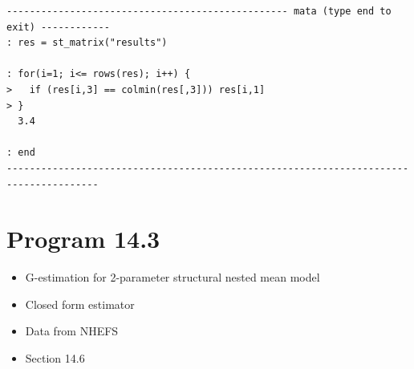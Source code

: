 \documentclass[
  10pt,
  a4paper,
]{book}
\providecommand{\tightlist}{%
  \setlength{\itemsep}{0pt}\setlength{\parskip}{0pt}}
\begin{document}
\begin{verbatim}
------------------------------------------------- mata (type end to exit) ------------
: res = st_matrix("results")

: for(i=1; i<= rows(res); i++) { 
>   if (res[i,3] == colmin(res[,3])) res[i,1]
> }
  3.4

: end
--------------------------------------------------------------------------------------
\end{verbatim}

\section{Program 14.3}\label{program-14.3-1}

\begin{itemize}
\tightlist
\item
  G-estimation for 2-parameter structural nested mean model
\item
  Closed form estimator
\item
  Data from NHEFS
\item
  Section 14.6
\end{itemize}
\end{document}
